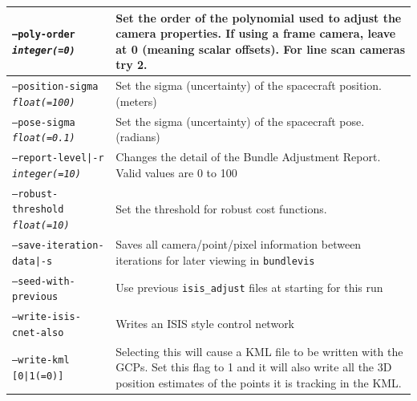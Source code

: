 \begin{longtable}{|l|p{10cm}|}
\texttt{--poly-order \textit{integer(=0)}} & Set the order of the polynomial used to adjust the camera properties. If using a frame camera, leave at 0 (meaning scalar offsets). For line scan cameras try 2. \\ \hline
\texttt{--position-sigma \textit{float(=100)}} & Set the sigma (uncertainty) of the spacecraft position. (meters) \\ \hline
\texttt{--pose-sigma \textit{float(=0.1)}} & Set the sigma (uncertainty) of the spacecraft pose. (radians) \\ \hline
\texttt{--report-level|-r \textit{integer(=10)}} & Changes the detail of the Bundle Adjustment Report. Valid values are 0 to 100 \\ \hline
\texttt{--robust-threshold \textit{float(=10)}} & Set the threshold for robust cost functions. \\ \hline
\texttt{--save-iteration-data|-s} & Saves all camera/point/pixel information between iterations for later viewing in \texttt{bundlevis} \\ \hline
\texttt{--seed-with-previous} & Use previous \texttt{isis\_adjust} files at starting for this run \\ \hline
\texttt{--write-isis-cnet-also} & Writes an ISIS style control network \\ \hline
\texttt{--write-kml [0|1(=0)]} & Selecting this will cause a KML file to be written with the GCPs. Set this flag to 1 and it will also write all the 3D position estimates of the points it is tracking in the KML. \\ \hline
\end{longtable}




